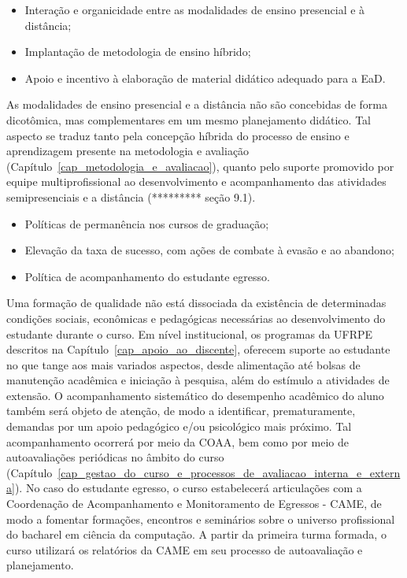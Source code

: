 \documentclass[
	12pt,				%
	openright,			%
  oneside,     %
	a4paper,			%
 hyphens,
	chapter=TITLE,		%
	english,			%
	french,				%
	spanish,			%
	brazil				%
	]{abntex2}
\begin{document}
\begin{itemize}
	\item Interação e organicidade entre as modalidades de ensino presencial e à distância;
	\item Implantação de metodologia de ensino híbrido;
	\item Apoio e incentivo à elaboração de material didático adequado para a EaD.
\end{itemize}
 	
As modalidades de ensino presencial e a distância não são concebidas de forma dicotômica, mas complementares em um mesmo planejamento didático. Tal aspecto se traduz tanto pela concepção híbrida do processo de ensino e aprendizagem presente na metodologia e avaliação (Capítulo~\ref{cap_metodologia_e_avaliacao}), quanto pelo suporte promovido por equipe multiprofissional ao desenvolvimento e acompanhamento das atividades semipresenciais e a distância (********* seção 9.1).

\begin{itemize}
	\item Políticas de permanência nos cursos de graduação;	
	\item Elevação da taxa de sucesso, com ações de combate à evasão e ao abandono;
	\item Política de acompanhamento do estudante egresso.
\end{itemize}
 
Uma formação de qualidade não está dissociada da existência de determinadas condições sociais, econômicas e pedagógicas necessárias ao desenvolvimento do estudante durante o curso. Em nível institucional, os programas da UFRPE descritos na Capítulo~\ref{cap_apoio_ao_discente}, oferecem suporte ao estudante no que tange aos mais variados aspectos, desde alimentação até bolsas de manutenção acadêmica e iniciação à pesquisa, além do estímulo a atividades de extensão. O acompanhamento sistemático do desempenho acadêmico do aluno também será objeto de atenção, de modo a identificar, prematuramente, demandas por um apoio pedagógico e/ou psicológico mais próximo. Tal acompanhamento ocorrerá por meio da COAA, bem como por meio de autoavaliações periódicas no âmbito do curso (Capítulo~\ref{cap_gestao_do_curso_e_processos_de_avaliacao_interna_e_externa}). No caso do estudante egresso, o curso estabelecerá articulações com a Coordenação de Acompanhamento e Monitoramento de Egressos - CAME, de modo a fomentar formações, encontros e seminários sobre o universo profissional do bacharel em ciência da computação. A partir da primeira turma formada, o curso utilizará os relatórios da CAME em seu processo de autoavaliação e planejamento.
\end{document}
